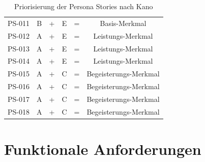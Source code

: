 \begin{table}[h!]
\begin{tabular}{cccccc}
PS-011        & B                                                             & + & E                                                                & = & Basis-Merkmal         \\
PS-012        & A                                                             & + & E                                                                & = & Leistungs-Merkmal     \\
PS-013        & A                                                             & + & E                                                                & = & Leistungs-Merkmal     \\
PS-014        & A                                                             & + & E                                                                & = & Leistungs-Merkmal     \\
PS-015        & A                                                             & + & C                                                                & = & Begeisterungs-Merkmal \\
PS-016        & A                                                             & + & C                                                                & = & Begeisterungs-Merkmal \\
PS-017        & A                                                             & + & C                                                                & = & Begeisterungs-Merkmal \\
PS-018        & A                                                             & + & C                                                                & = & Begeisterungs-Merkmal
\end{tabular}
\caption{Priorisierung der Persona Stories nach Kano}
\end{table}

\newpage{}
\section{Funktionale Anforderungen}
\label{sec:funktionaleanforderungen}

\begin{usecase}
\end{usecase}

